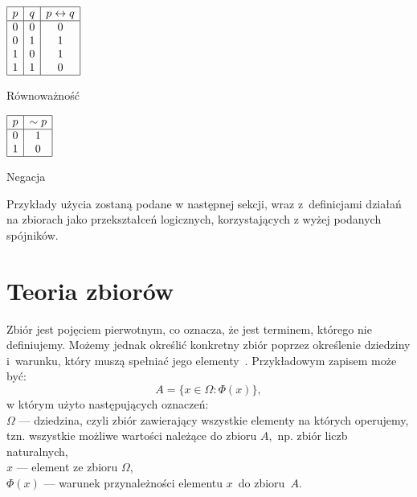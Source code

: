 \documentclass{SGGW-thesis}
\begin{document}
\begin{table}[h]
\vspace{1cm}

\parbox{.45\linewidth}{
    \centering

    $\begin{array}{|c|c|c|}
        \hline
        p & q & p \leftrightarrow q \\
        \hline
        0 & 0 & 0 \\
        0 & 1 & 1 \\
        1 & 0 & 1 \\
        1 & 1 & 0 \\
        \hline
    \end{array}$
    \caption{Równoważność}
}
\parbox{.45\linewidth}{
    \centering

    $\begin{array}{|c|c|}
        \hline
        p & \sim p \\
        \hline
        0 & 1 \\
        1 & 0 \\
        \hline
    \end{array}$
    \caption{Negacja}
}
\end{table}

\begin{paragraph}{}
    Przykłady użycia zostaną podane w następnej sekcji, wraz z~definicjami działań na zbiorach jako przekształceń logicznych, korzystających z wyżej podanych spójników.
\end{paragraph}
\newpage


\newpage

\section{Teoria zbiorów\label{sec:2.2}}

\begin{paragraph}{}
    Zbiór jest pojęciem pierwotnym, co oznacza, że jest terminem, którego nie definiujemy. Możemy jednak określić konkretny zbiór poprzez określenie dziedziny i~warunku, który muszą spełniać jego elementy~\cite{wiki:Zbior}. Przykładowym zapisem może być: 
    \begin{equation}
        A = \{x \in \Omega: \Phi(x) \},
    \end{equation}
       w którym użyto następujących oznaczeń:\\
       $\Omega$ --- dziedzina, czyli zbiór zawierający wszystkie elementy na których operujemy, tzn. wszystkie możliwe wartości należące do zbioru $A$,~np. zbiór liczb naturalnych, \\
       $x$ --- element ze zbioru $\Omega$, \\
       $\Phi\left( x \right)$ --- warunek przynależności elementu $x$~do zbioru~$A$. 
\end{paragraph}
\end{document}
